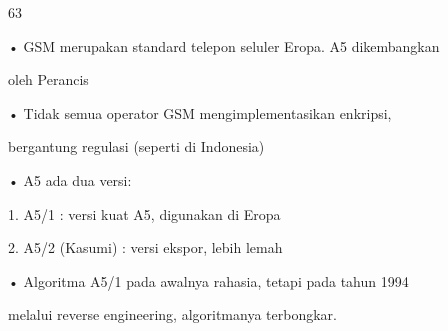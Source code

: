 \documentclass{article}
\begin{document}

63

• GSM merupakan standard telepon seluler Eropa. A5 dikembangkan 

oleh Perancis

• Tidak semua operator GSM mengimplementasikan  enkripsi, 

bergantung regulasi (seperti di Indonesia)

• A5 ada dua versi: 


1. A5/1 : versi kuat A5, digunakan di Eropa


2. A5/2 (Kasumi) : versi ekspor, lebih lemah

• Algoritma A5/1 pada awalnya rahasia, tetapi pada tahun 1994 

melalui reverse engineering, algoritmanya terbongkar.
\end{document}
